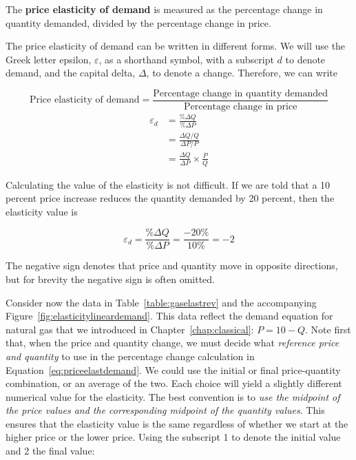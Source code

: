 \begin{DefBox}
The \textbf{price elasticity of demand} is measured as the percentage change in quantity demanded, divided by the percentage change in price.
\end{DefBox}

The price elasticity of demand can be written in different forms. We will use the Greek letter epsilon, $\varepsilon$, as a shorthand symbol, with a subscript $d$ to denote demand, and the capital delta, $\Delta$, to denote a change. Therefore, we can write


\begin{equation*}
\text{Price elasticity of demand}=\frac{\text{Percentage change in quantity demanded}}{\text{Percentage change in price}}
\end{equation*}
\begin{subequations} \label{eq:priceelastdemand}
\begin{align}
\varepsilon_d	&=\frac{\%\Delta Q}{\%\Delta P}	\\
						&=\frac{\Delta Q/Q}{\Delta P/P}	\\
						&=\frac{\Delta Q}{\Delta P}\times\frac{P}{Q}
\end{align}
\end{subequations}

Calculating the value of the elasticity is not difficult. If we are told that a 10 percent price increase reduces the quantity demanded by 20 percent, then the elasticity value is

\begin{equation*}
\varepsilon_d=\frac{\%\Delta Q}{\%\Delta P}=\frac{-20\%}{10\%}=-2
\end{equation*}

The negative sign denotes that price and quantity move in opposite directions, but for brevity the negative sign is often omitted.

Consider now the data in Table~\ref{table:gaselastrev} and the accompanying Figure~\ref{fig:elasticitylineardemand}. This data reflect the demand equation for natural gas that we introduced in Chapter~\ref{chap:classical}: $P=10-Q$. Note first that, when the price and quantity change, we must decide what \textit{reference price and quantity} to use in the percentage change calculation in Equation~\ref{eq:priceelastdemand}. We could use the initial or final price-quantity combination, or an average of the two. Each choice will yield a slightly different numerical value for the elasticity. The best convention is to \textit{use the midpoint of the price values and the corresponding midpoint of the quantity values}. This ensures that the elasticity value is the same regardless of whether we start at the higher price or the lower price. Using the subscript 1 to denote the initial value and 2 the final value:

